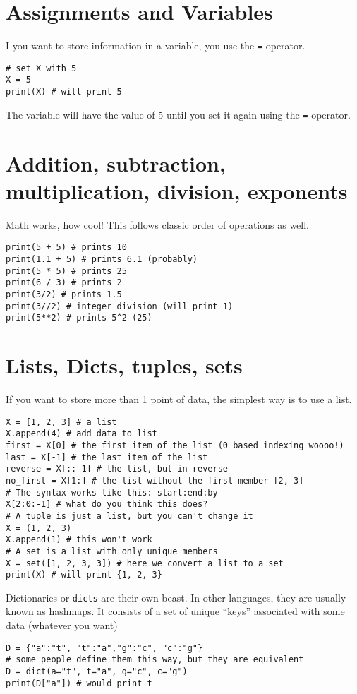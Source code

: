 \documentclass{assignments}
\date{}
\title{}
\begin{document}
\section*{Assignments and Variables}
\label{sec:org52d922b}
I you want to store information in a variable, you use the \texttt{=} operator.
\begin{verbatim}
# set X with 5
X = 5
print(X) # will print 5
\end{verbatim}
The variable will have the value of 5 until you set it again using the \texttt{=} operator.
\section*{Addition, subtraction, multiplication, division, exponents}
\label{sec:orga992d6c}
Math works, how cool! This follows classic order of operations as well.
\begin{verbatim}
print(5 + 5) # prints 10
print(1.1 + 5) # prints 6.1 (probably)
print(5 * 5) # prints 25
print(6 / 3) # prints 2
print(3/2) # prints 1.5
print(3//2) # integer division (will print 1)
print(5**2) # prints 5^2 (25)

\end{verbatim}
\section*{Lists, Dicts, tuples, sets}
\label{sec:org81eaaac}
If you want to store more than 1 point of data, the simplest way is to use a
list.
\begin{verbatim}
X = [1, 2, 3] # a list
X.append(4) # add data to list
first = X[0] # the first item of the list (0 based indexing woooo!)
last = X[-1] # the last item of the list
reverse = X[::-1] # the list, but in reverse
no_first = X[1:] # the list without the first member [2, 3]
# The syntax works like this: start:end:by
X[2:0:-1] # what do you think this does?
# A tuple is just a list, but you can't change it
X = (1, 2, 3)
X.append(1) # this won't work
# A set is a list with only unique members
X = set([1, 2, 3, 3]) # here we convert a list to a set
print(X) # will print {1, 2, 3}
\end{verbatim}
Dictionaries or \texttt{dicts} are their own beast. In other languages, they are usually
known as hashmaps. It consists of a set of unique ``keys'' associated with some
data (whatever you want)
\begin{verbatim}
D = {"a":"t", "t":"a","g":"c", "c":"g"}
# some people define them this way, but they are equivalent
D = dict(a="t", t="a", g="c", c="g")
print(D["a"]) # would print t
\end{verbatim}
\end{document}
